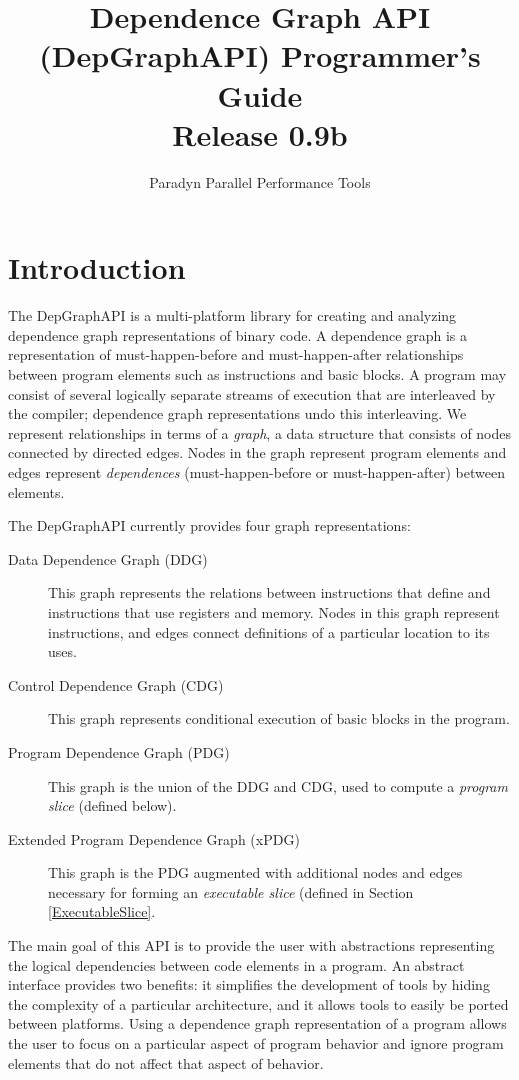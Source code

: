 \documentclass[12pt,titlepage]{article}
\begin{document}
\title{Dependence Graph API (DepGraphAPI) Programmer's Guide \\ Release 0.9b}
\author{Paradyn Parallel Performance Tools}
\maketitle
\tableofcontents
\section{Introduction}

The DepGraphAPI is a multi-platform library for creating and analyzing
dependence graph representations of binary code. A dependence graph is
a representation of must-happen-before and must-happen-after
relationships between program elements such as instructions and basic
blocks. A program may consist of several logically separate streams
of execution that are interleaved by the compiler; dependence graph
representations undo this interleaving. We represent
relationships in terms of a \emph{graph}, a data structure that
consists of nodes connected by directed edges. Nodes in the graph
represent program elements and edges represent \emph{dependences}
(must-happen-before or must-happen-after) between
elements.

The DepGraphAPI currently provides four graph representations:
\begin{description}
\item[Data Dependence Graph (DDG)] This graph represents the relations
between instructions that define and instructions that use registers
and memory. Nodes in this graph represent instructions, and edges
connect definitions of a particular location to its uses.
\item[Control Dependence Graph (CDG)] This graph represents
conditional execution of basic blocks in the program.
\item[Program Dependence Graph (PDG)] This graph is the union of the
DDG and CDG, used to compute a \emph{program slice} (defined below).
\item[Extended Program Dependence Graph (xPDG)] This graph is the PDG
augmented with additional nodes and edges necessary for forming an
\emph{executable slice} (defined in Section \ref{ExecutableSlice}.
\end{description}

The main goal of this API is to provide the user with abstractions
representing the logical dependencies between code elements in a
program. An abstract interface provides two benefits: it simplifies
the development of tools by hiding the complexity of a particular
architecture, and it allows tools to easily be ported
between platforms. Using a dependence graph representation of a
program allows the user to focus on a particular aspect of program
behavior and ignore program elements that do not affect that aspect of
behavior.
\end{document}
